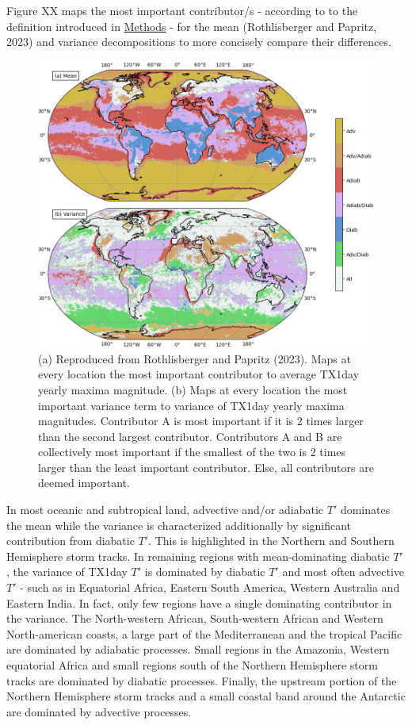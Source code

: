 \documentclass[11pt,a4paper,twoside,openright]{report}
\theoremstyle{definition}
\begin{document}
Figure XX maps the most important contributor/s - according to to the definition introduced in \hyperref[decomposition-of-tx1day-anomalies-and-their-yearly-variance]{Methods} - for the mean (Rothlisberger and Papritz, 2023) and variance decompositions to more concisely compare their differences.

\begin{figure}[h]
\includegraphics[width=1\linewidth]{images/dominant} \caption{(a) Reproduced from Rothlisberger and Papritz (2023). Maps at every location the most important contributor to average TX1day yearly maxima magnitude. (b) Maps at every location the most important variance term to variance of TX1day yearly maxima magnitudes. Contributor A is most important if it is 2 times larger than the second largest contributor. Contributors A and B are collectively most important if the smallest of the two is 2 times larger than the least important contributor. Else, all contributors are deemed important.}\label{fig:dominant}
\end{figure}

In most oceanic and subtropical land, advective and/or adiabatic \(T'\) dominates the mean while the variance is characterized additionally by significant contribution from diabatic \(T'\). This is highlighted in the Northern and Southern Hemisphere storm tracks. In remaining regions with mean-dominating diabatic \(T'\), the variance of TX1day \(T'\) is dominated by diabatic \(T'\) and most often advective \(T'\) - such as in Equatorial Africa, Eastern South America, Western Australia and Eastern India. In fact, only few regions have a single dominating contributor in the variance. The North-western African, South-western African and Western North-american coasts, a large part of the Mediterranean and the tropical Pacific are dominated by adiabatic processes. Small regions in the Amazonia, Western equatorial Africa and small regions south of the Northern Hemisphere storm tracks are dominated by diabatic processes. Finally, the upstream portion of the Northern Hemisphere storm tracks and a small coastal band around the Antarctic are dominated by advective processes.
\end{document}
